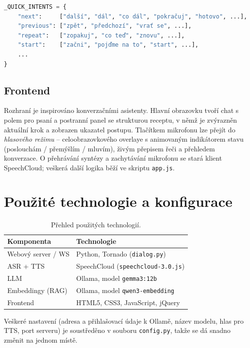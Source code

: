 \documentclass[11pt,a4paper]{article}
\begin{document}
\begin{lstlisting}[language=Python,caption={Rychlá klasifikace běžných příkazů (zkráceno).}]
_QUICK_INTENTS = {
    "next":     ["další", "dál", "co dál", "pokračuj", "hotovo", ...],
    "previous": ["zpět", "předchozí", "vrať se", ...],
    "repeat":   ["zopakuj", "co teď", "znovu", ...],
    "start":    ["začni", "pojďme na to", "start", ...],
    ...
}
\end{lstlisting}

\subsection{Frontend}
Rozhraní je inspirováno konverzačními asistenty. Hlavní obrazovku tvoří chat
s polem pro psaní a postranní panel se strukturou receptu, v němž je zvýrazněn
aktuální krok a zobrazen ukazatel postupu. Tlačítkem mikrofonu lze přejít do
\emph{hlasového režimu} -- celoobrazovkového overlaye s animovaným indikátorem stavu
(poslouchám / přemýšlím / mluvím), živým přepisem řeči a přehledem konverzace.
O přehrávání syntézy a zachytávání mikrofonu se stará klient SpeechCloud; veškerá
další logika běží ve skriptu \texttt{app.js}.

\section{Použité technologie a konfigurace}
\begin{table}[h]
\centering\small
\begin{tabular}{@{}ll@{}}
\toprule
\textbf{Komponenta} & \textbf{Technologie} \\
\midrule
Webový server / WS    & Python, Tornado (\texttt{dialog.py}) \\
ASR + TTS             & SpeechCloud (\texttt{speechcloud-3.0.js}) \\
LLM                   & Ollama, model \texttt{gemma3:12b} \\
Embeddingy (RAG)      & Ollama, model \texttt{qwen3-embedding} \\
Frontend              & HTML5, CSS3, JavaScript, jQuery \\
\bottomrule
\end{tabular}
\caption{Přehled použitých technologií.}
\end{table}

Veškeré nastavení (adresa a přihlašovací údaje k Ollamě, název modelu, hlas pro TTS,
port serveru) je soustředěno v souboru \texttt{config.py}, takže se dá snadno změnit
na jednom místě.
\end{document}
